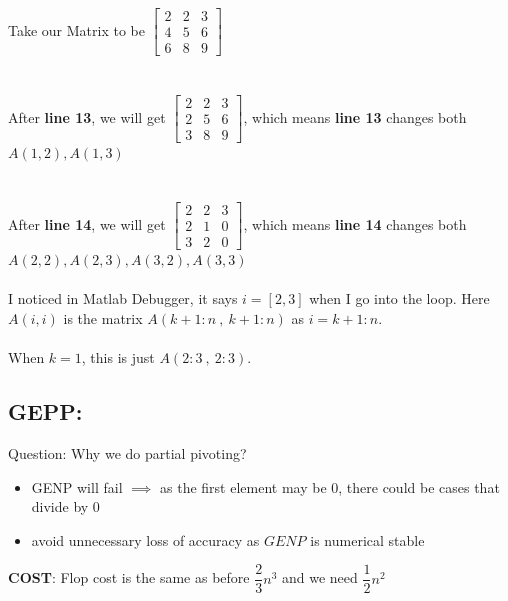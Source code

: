 \documentclass [9 pt]{article}
\theoremstyle{definition}
\begin{document}
\newpage


Take our Matrix to be $\begin{bmatrix}
	2 & 2 & 3\\
	4 & 5 & 6\\
	6 & 8 & 9
\end{bmatrix}$ \\
\\
\\
After \textbf{line 13}, we will get $\begin{bmatrix}
	2 & 2 & 3\\
	2 & 5 & 6\\
	3 & 8 & 9
\end{bmatrix}$, which means \textbf{line 13} changes both $A(1,2), A(1,3)$\\
\\
\\
After \textbf{line 14}, we will get $\begin{bmatrix}
	2 & 2 & 3\\
	2 & 1 & 0\\
	3 & 2 & 0
\end{bmatrix}$, which means \textbf{line 14} changes both $A(2,2), A(2,3), A(3,2) ,A(3,3)$\\
\\
I noticed in Matlab Debugger, it says $i = [2, 3]$ when I go into the loop.
Here $A(i,i)$ is the matrix  $A(k+1:n\  ,\ k+1:n)$ as $i = k+1:n$.\\
\\
When $k=1$, this is just $A(2:3\ ,\ 2:3)$.



















\newpage
\subsection*{GEPP:}
Question: Why we do partial pivoting?
\begin{itemize}
	\item GENP will fail $\implies$ as the first element may be 0, there could be cases that divide by 0
	\item avoid unnecessary loss of accuracy as $GENP$ is numerical stable
\end{itemize}

\textbf{COST}: Flop cost is the same as before $\dfrac{2}{3}n^3$ and we need  $\dfrac{1}{2}n^2$
\newpage

\end{document}
